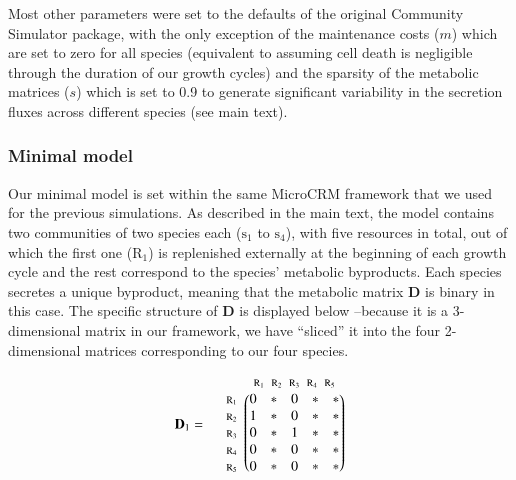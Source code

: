 \documentclass[a4paper,10pt]{article}
\begin{document}
Most other parameters were set to the defaults of the original Community Simulator
package, with the only exception of the maintenance costs ($m$) which are set to
zero for all species
(equivalent to assuming cell death is negligible through the duration of our growth cycles)
and the sparsity of the metabolic matrices ($s$) which is set to 0.9
to generate significant variability in the secretion fluxes across different species
(see main text).

\subsubsection*{Minimal model}\label{methods:sim-min}

Our minimal model is set within the same MicroCRM framework that we used
for the previous simulations.
As described in the main text, the model contains two communities
of two species each
($\mathrm{s}_1$ to $\mathrm{s}_4$),
with five resources in total, out of which the first one ($\mathrm{R}_1$)
is replenished externally at the beginning of each growth cycle
and the rest correspond to the species' metabolic byproducts.
Each species secretes a unique byproduct, meaning that the metabolic
matrix $\mathbf{D}$ is binary in this case.
The specific structure of $\mathbf{D}$ is displayed below
--because it is a 3-dimensional matrix in our framework,
we have ``sliced'' it into the four 2-dimensional matrices corresponding to
our four species.

\begin{equation*}
\mathbf{D}_1 = \; \; \; \; \; \begin{matrix}
 & 

\begin{matrix}
\text{\scriptsize $\mathrm{R}_1$} \!\!\! & 
\text{\scriptsize $\mathrm{R}_2$} \!\!\! & 
\text{\scriptsize $\mathrm{R}_3$} \!\!\! & 
\text{\scriptsize $\mathrm{R}_4$} \!\!\! & 
\text{\scriptsize $\mathrm{R}_5$}
\end{matrix}

\\ 

\begin{matrix*}[l]
\text{\scriptsize $\mathrm{R}_1$} \!\!\! \\
\text{\scriptsize $\mathrm{R}_2$} \!\!\! \\
\text{\scriptsize $\mathrm{R}_3$} \!\!\! \\
\text{\scriptsize $\mathrm{R}_4$} \!\!\! \\
\text{\scriptsize $\mathrm{R}_5$} \!\!\!
\end{matrix*}

& 

\begin{pmatrix}
0 & * & 0 & * & * \\
1 & * & 0 & * & * \\
0 & * & 1 & * & * \\
0 & * & 0 & * & * \\
0 & * & 0 & * & *
\end{pmatrix}

\end{matrix}
\end{equation*}
\end{document}
